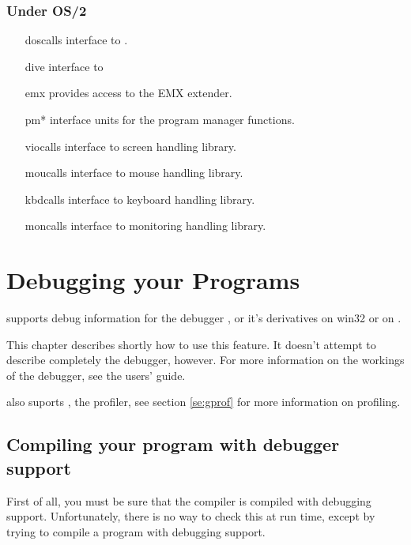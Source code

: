 \documentclass{report}
\begin{document}
\subsection{Under OS/2}
\begin{itemize}
\item [doscalls] interface to .
\item [dive] interface to 
\item [emx] provides access to the EMX extender.
\item [pm*] interface units for the program manager functions.
\item [viocalls] interface to  screen handling library.
\item [moucalls] interface to  mouse handling library.
\item [kbdcalls] interface to  keyboard handling library.
\item [moncalls] interface to  monitoring handling library.
\end{itemize}


\chapter{Debugging your Programs}

\fpc supports debug information for the \gnu debugger , or
it's derivatives  on win32 or  on \linux.

This chapter describes shortly how to use this feature. It doesn't attempt
to describe completely the \gnu debugger, however.
For more information on the workings of the \gnu debugger, see the 
users' guide.

\fpc also suports , the \gnu profiler, see section \ref{se:gprof}
for more information on profiling.

\section{Compiling your program with debugger support}
First of all, you must be sure that the compiler is compiled with debugging
support. Unfortunately, there is no way to check this at run time, except by
trying to compile a program with debugging support.
\end{document}
